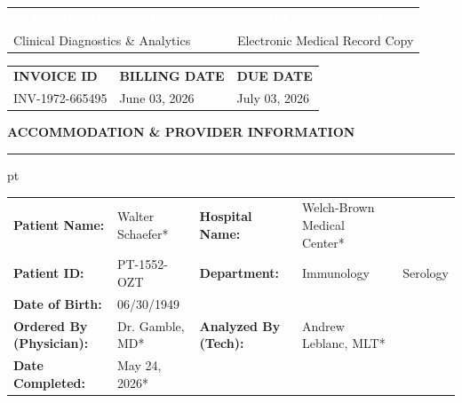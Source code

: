 \documentclass[10pt,letterpaper]{article}
\begin{document}
\begin{tcolorbox}[headerbox]
    \begin{tabularx}{\textwidth}{X r}
        \textcolor{white}{\fontsize{20pt}{24pt}\selectfont\bfseries BLUE RIDGE LABORATORIES} & 
        \textcolor{white}{\fontsize{14pt}{18pt}\selectfont\bfseries BILLING STATEMENT} \\
        \textcolor{white!80!branddark}{\small Clinical Diagnostics \& Analytics} & 
        \textcolor{white!80!branddark}{\small Electronic Medical Record Copy}
    \end{tabularx}
\end{tcolorbox}

\vspace{1em}

\begin{tabularx}{\textwidth}{@{}X X X@{}}
    {\bfseries\color{brandsecondary} INVOICE ID} & {\bfseries\color{brandsecondary} BILLING DATE} & {\bfseries\color{brandsecondary} DUE DATE} \\
    INV-1972-665495 & June 03, 2026 & July 03, 2026 \\
    \cmidrule(r){1-1}\cmidrule(lr){2-2}\cmidrule(l){3-3}
\end{tabularx}

\vspace{1.5em}

\begin{tcolorbox}[invoicebox]
    {\fontsize{12pt}{14pt}\selectfont\bfseries\color{branddark} ACCOMMODATION \& PROVIDER INFORMATION}
    \vspace{0.8em}
    \hrule height 0.5pt pt\color{borderlight}
    \vspace{0.8em}
    
    \begin{tabularx}{\textwidth}{@{}l X l X@{}}
        {\bfseries Patient Name:} & Walter Schaefer* & {\bfseries Hospital Name:} & Welch-Brown Medical Center* \\
        {\bfseries Patient ID:} & PT-1552-OZT & {\bfseries Department:} & Immunology & Serology \\
        {\bfseries Date of Birth:} & 06/30/1949 & & \\
        \addlinespace
        \cmidrule(lr){1-2}\cmidrule(lr){3-4}
        \addlinespace
        {\bfseries Ordered By (Physician):} & Dr. Gamble, MD* & {\bfseries Analyzed By (Tech):} & Andrew Leblanc, MLT* \\
        {\bfseries Date Completed:} & May 24, 2026* & & \\
    \end{tabularx}
\end{tcolorbox}
\end{document}
